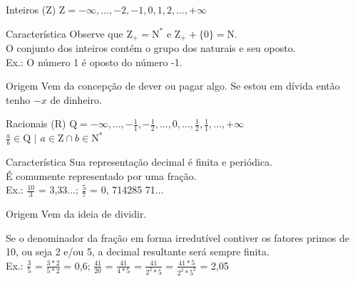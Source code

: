 \documentclass{beamer}
\begin{document}
    \begin{frame}{Inteiros ($\mathrm{Z}$)}
        $\mathrm{Z} = -\infty, ...,-2,-1, 0, 1, 2, ..., +\infty$
        \newline
        \begin{block}{Característica}
            Observe que $\mathrm{Z_+} = \mathrm{N^*}$ e $\mathrm{Z_+} +\{0\} = \mathrm{N}$.\\
            O conjunto dos inteiros contém o grupo dos naturais e seu oposto.\\
            Ex.: O número 1 é oposto do número -1.
        \end{block}
        \begin{block}{Origem}
            Vem da concepção de dever ou pagar algo. Se estou em dívida então tenho $-x$ de dinheiro.
        \end{block}
    \end{frame}
    
    \begin{frame}{Racionais ($\mathrm{R}$)}
        $\mathrm{Q} = -\infty, ..., -\frac{1}{1}, -\frac{1}{2}, ..., 0, ..., \frac{1}{2}, \frac{1}{1}, ..., +\infty$\\
        $\frac{a}{b} \in \mathrm{Q}$ $|$ $a \in \mathrm{Z} \cap b \in \mathrm{N^*}$
        \newline
        \begin{block}{Característica}
            Sua representação decimal é finita e periódica.\\ É comumente representado por uma fração.\\
            Ex.: $\frac{10}{3}$ = 3,33...; $\frac{5}{7}$ = 0, 714285 71...
        \end{block}
        \begin{block}{Origem}
            Vem da ideia de dividir.
        \end{block}
        \begin{alertblock}{}
            Se o denominador da fração em forma irredutível contiver os fatores primos de 10, ou seja 2 e/ou 5, a decimal resultante será sempre finita.\\
            Ex.: $\frac{3}{5}$ = $\frac{3*2}{5*2}$ = 0,6; $\frac{41}{20}$ = $\frac{41}{4*5}$ = $\frac{41}{2^2*5}$ = $\frac{41*5}{2^2*5^2}$ = 2,05
        \end{alertblock}
    \end{frame}
    
\end{document}
